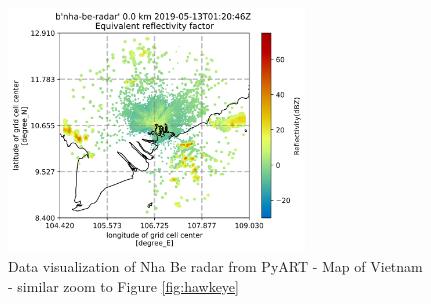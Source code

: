 \begin{figure}[H]
    \centering
    \includegraphics[width=0.7\textwidth]{Images/3.1-201905130120.DBZ-pyart.png}
    \vspace{2em}
    \caption{Data visualization of Nha Be radar from PyART - Map of Vietnam - similar zoom to Figure \ref{fig:hawkeye}}
    \label{fig:nha-be-viz-far}
\end{figure}

